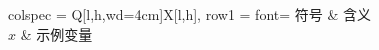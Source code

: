 \begin{tblr}{colspec = {Q[l,h,wd=4cm]X[l,h]}, row{1} = {font=\bfseries}}
符号 & 含义 \\
$x$ & 示例变量 \\
\end{tblr}
